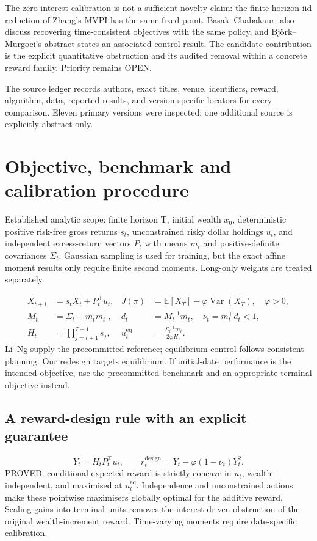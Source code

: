 \documentclass[11pt,a4paper]{article}
\theoremstyle{plain}
\theoremstyle{definition}
\newcommand{\E}{\mathbb{E}}
\newcommand{\Var}{\operatorname{Var}}
\begin{document}
The zero-interest calibration is not a sufficient novelty claim: the finite-horizon iid reduction of Zhang's MVPI has the same fixed point. Basak--Chabakauri also discuss recovering time-consistent objectives with the same policy, and Björk--Murgoci's abstract states an associated-control result. The candidate contribution is the explicit quantitative obstruction and its audited removal within a concrete reward family. Priority remains OPEN. \cite{ref6,ref10,ref12}

The source ledger records authors, exact titles, venue, identifiers, reward, algorithm, data, reported results, and version-specific locators for every comparison. Eleven primary versions were inspected; one additional source is explicitly abstract-only.


\section{Objective, benchmark and calibration procedure}

Established analytic scope: finite horizon T, initial wealth $x_0$, deterministic positive risk-free gross returns $s_t$, unconstrained risky dollar holdings $u_t$, and independent excess-return vectors $P_t$ with means $m_t$ and positive-definite covariances $\Sigma_t$. Gaussian sampling is used for training, but the exact affine moment results only require finite second moments. Long-only weights are treated separately.

\begin{equation}
\begin{aligned}
 X_{t+1}&=s_tX_t+P_t^{\top}u_t,& J(\pi)&=\E[X_T]-\varphi\Var(X_T),\quad\varphi>0,\\
 M_t&=\Sigma_t+m_tm_t^{\top},& d_t&=M_t^{-1}m_t,\quad\nu_t=m_t^{\top}d_t<1,\\
 H_t&=\prod_{j=t+1}^{T-1}s_j,&u_t^{\mathrm{eq}}&=\frac{\Sigma_t^{-1}m_t}{2\varphi H_t}.
 \end{aligned}
\end{equation}
Li--Ng supply the precommitted reference; equilibrium control follows consistent planning. Our redesign targets equilibrium. If initial-date performance is the intended objective, use the precommitted benchmark and an appropriate terminal objective instead. \cite{ref9,ref10,ref7}

\subsection{A reward-design rule with an explicit guarantee}
\begin{equation}
Y_t=H_tP_t^{\top}u_t,\qquad r_t^{\mathrm{design}}=Y_t-\varphi(1-\nu_t)Y_t^2.
\end{equation}
PROVED: conditional expected reward is strictly concave in $u_t$, wealth-independent, and maximised at $u_t^{\mathrm{eq}}$. Independence and unconstrained actions make these pointwise maximisers globally optimal for the additive reward. Scaling gains into terminal units removes the interest-driven obstruction of the original wealth-increment reward. Time-varying moments require date-specific calibration.
\end{document}
